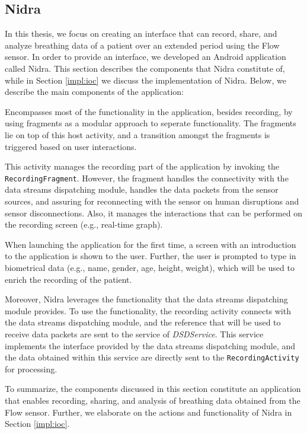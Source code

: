 \subsection{Nidra}
In this thesis, we focus on creating an interface that can record, share, and analyze breathing data of a patient over an extended period using the Flow sensor. In order to provide an interface, we developed an Android application called Nidra. This section describes the components that Nidra constitute of, while in Section \ref{impl:ioc} we discuss the implementation of Nidra. Below, we describe the main components of the application:
 
\begin{description}[font=\normalfont\itshape]
    \item[MainActivity:] Encompasses most of the functionality in the application, besides recording, by using fragments as a modular approach to seperate functionality. The fragments lie on top of this host activity, and a transition amongst the fragments is triggered based on user interactions. 
    \item[RecordingActivity:] This activity manages the recording part of the application by invoking the \verb|RecordingFragment|. However, the fragment handles the connectivity with the data streams dispatching module, handles the data packets from the sensor sources, and assuring for reconnecting with the sensor on human disruptions and sensor disconnections. Also, it manages the interactions that can be performed on the recording screen (e.g., real-time graph).
    \item[LandingActivity:] When launching the application for the first time, a screen with an introduction to the application is shown to the user. Further, the user is prompted to type in biometrical data (e.g., name, gender, age, height, weight), which will be used to enrich the recording of the patient. 
\end{description}

Moreover, Nidra leverages the functionality that the data streams dispatching module provides. To use the functionality, the recording activity connects with the data streams dispatching module, and the reference that will be used to receive data packets are sent to the service of \textit{DSDService}. This service implements the interface provided by the data streams dispatching module, and the data obtained within this service are directly sent to the \verb|RecordingActivity| for processing. 


To summarize, the components discussed in this section constitute an application that enables recording, sharing, and analysis of breathing data obtained from the Flow sensor. Further, we elaborate on the actions and functionality of Nidra in Section \ref{impl:ioc}.  


